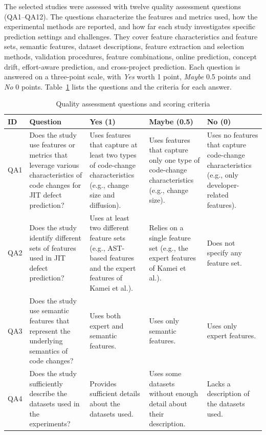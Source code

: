 \documentclass[sigconf,review]{acmart}
\begin{document}
The selected studies were assessed with twelve quality assessment questions (QA1--QA12). The questions characterize the features and metrics used, how the experimental methods are reported, and how far each study investigates specific prediction settings and challenges. They cover feature characteristics and feature sets, semantic features, dataset descriptions, feature extraction and selection methods, validation procedures, feature combinations, online prediction, concept drift, effort-aware prediction, and cross-project prediction. Each question is answered on a three-point scale, with \textit{Yes} worth 1 point, \textit{Maybe} 0.5 points and \textit{No} 0 points. Table~\ref{tab:quality-assessment} lists the questions and the criteria for each answer.

\begin{table}[t]
    \centering
    \footnotesize
    \setlength{\tabcolsep}{4pt}
    \caption{Quality assessment questions and scoring criteria}
    \label{tab:quality-assessment}
    \begin{tabular}{@{}p{}p{}p{}p{}p{}@{}}
        \toprule
        \textbf{ID} & \textbf{Question} & \textbf{Yes (1)} & \textbf{Maybe (0.5)} & \textbf{No (0)} \\
        \midrule
        QA1 & Does the study use features or metrics that leverage various characteristics of code changes for JIT defect prediction? & Uses features that capture at least two types of code-change characteristics (e.g., change size and diffusion). & Uses features that capture only one type of code-change characteristics (e.g., change size). & Uses no features that capture code-change characteristics (e.g., only developer-related features). \\
        QA2 & Does the study identify different sets of features used in JIT defect prediction? & Uses at least two different feature sets (e.g., AST-based features and the expert features of Kamei et al.). & Relies on a single feature set (e.g., the expert features of Kamei et al.). & Does not specify any feature set. \\
        QA3 & Does the study use semantic features that represent the underlying semantics of code changes? & Uses both expert and semantic features. & Uses only semantic features. & Uses only expert features. \\
        QA4 & Does the study sufficiently describe the datasets used in the experiments? & Provides sufficient details about the datasets used. & Uses some datasets without enough detail about their description. & Lacks a description of the datasets used. \\

\end{tabular}
\end{table}
\end{document}
